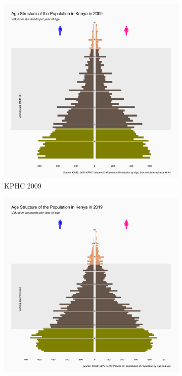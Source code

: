 \documentclass[a4paper]{article}
\begin{document}
\begin{figure}
  \centering
  \begin{subfigure}[b]{0.45\linewidth}
    \includegraphics[width=\linewidth]{Kenyan_Population_2009.pdf}
    \caption{\centering KPHC 2009}
    \label{fig:Population distribution by age and sex 2009}
  \end{subfigure}
  \hfill
  \begin{subfigure}[b]{0.45\linewidth}
    \includegraphics[width=\linewidth]{Kenyan_Population_2019.pdf}

\end{subfigure}
\end{figure}
\end{document}
